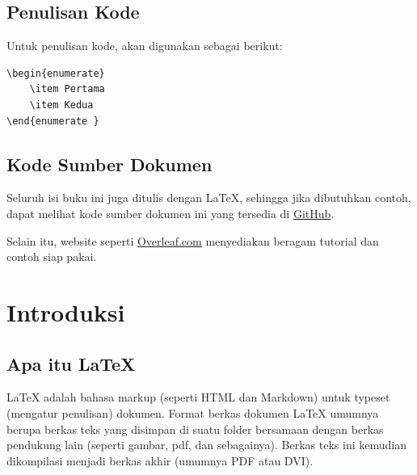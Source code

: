 \documentclass{book} %
\begin{document}
	\section{Penulisan Kode}
	Untuk penulisan kode, akan digunakan sebagai berikut:

    \begin{verbatim}
\begin{enumerate}
    \item Pertama
    \item Kedua
\end{enumerate }
    \end{verbatim}

    \section{Kode Sumber Dokumen}

    Seluruh isi buku ini juga ditulis dengan LaTeX, sehingga jika dibutuhkan contoh, dapat melihat
    kode sumber dokumen ini yang tersedia di \href{https://github.com/mekatronik-achmadi/my_latexbook/blob/master/Modul/LaTex/latex_beginner.tex}{GitHub}.

    \bigskip

    Selain itu, website seperti \href{https://www.overleaf.com/}{Overleaf.com} menyediakan beragam tutorial dan contoh siap pakai.


    \newpage

    \mainmatter %
    \chapter{Introduksi}

    \section{Apa itu LaTeX}

    LaTeX adalah bahasa markup (seperti HTML dan Markdown) untuk typeset (mengatur penulisan) dokumen.
    Format berkas dokumen LaTeX umumnya berupa berkas teks yang disimpan di suatu folder
    bersamaan dengan berkas pendukung lain (seperti gambar, pdf, dan sebagainya).
    Berkas teks ini kemudian dikompilasi menjadi berkas akhir (umumnya PDF atau DVI).
\end{document}
